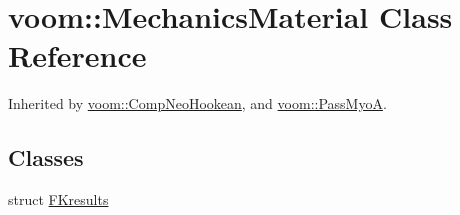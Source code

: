 \hypertarget{classvoom_1_1_mechanics_material}{
\section{voom::MechanicsMaterial Class Reference}
\label{classvoom_1_1_mechanics_material}
}


Inherited by \hyperlink{classvoom_1_1_comp_neo_hookean}{voom::CompNeoHookean}, and \hyperlink{classvoom_1_1_pass_myo_a}{voom::PassMyoA}.\subsection*{Classes}
\begin{DoxyCompactItemize}
\item 
struct \hyperlink{structvoom_1_1_mechanics_material_1_1_f_kresults}{FKresults}
\end{DoxyCompactItemize}
